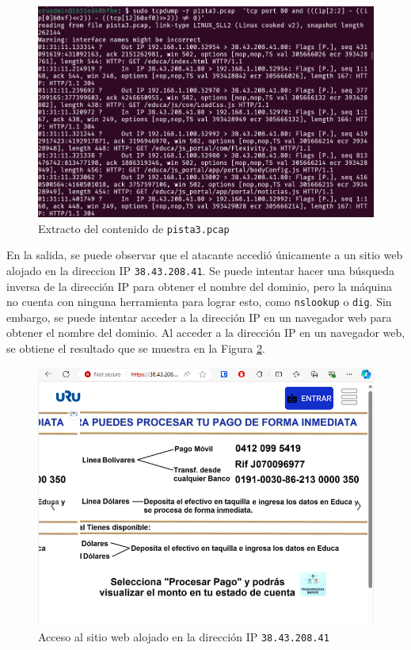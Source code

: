 \documentclass{article}
\begin{document}
\begin{figure}[ht!]
  \includegraphics[width=\textwidth]{pista3.png}
  \caption{Extracto del contenido de \texttt{pista3.pcap}}
  \label{fig:pista3}
\end{figure}

En la salida, se puede observar que el atacante accedió únicamente a un sitio web alojado en la direccion IP \texttt{38.43.208.41}. Se puede intentar hacer una búsqueda inversa de la dirección IP para obtener el nombre del dominio, pero la máquina no cuenta con ninguna herramienta para lograr esto, como \texttt{nslookup} o \texttt{dig}. Sin embargo, se puede intentar acceder a la dirección IP en un navegador web para obtener el nombre del dominio. Al acceder a la dirección IP en un navegador web, se obtiene el resultado que se muestra en la Figura \ref{fig:web}.


\begin{figure}[ht!]
  \includegraphics[width=\textwidth]{web.png}
  \caption{Acceso al sitio web alojado en la dirección IP \texttt{38.43.208.41}}
  \label{fig:web}
\end{figure}
\end{document}
